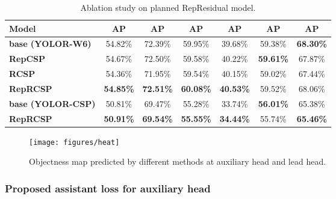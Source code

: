 \documentclass[10pt,twocolumn,letterpaper]{article}
\begin{document}
		
		
		\begin{table}[h]
			\centering
			\begin{threeparttable}[h]
				\footnotesize
				\caption{Ablation study on planned RepResidual model.}
				\label{table:reverse}
				\setlength\tabcolsep{.5pt}
				\begin{tabular}{lcccccc}
					\toprule
					\textbf{Model} & \textbf{AP} & \textbf{AP} & \textbf{AP} & \textbf{AP} & \textbf{AP} & \textbf{AP}  \\	
					\midrule
					\textbf{base (YOLOR-W6)} & 54.82\% & 72.39\% & 59.95\% & 39.68\% & 59.38\% & \textbf{68.30\%} \\
					\textbf{RepCSP} & 54.67\% & 72.50\% & 59.58\% & 40.22\% & \textbf{59.61\%} & 67.87\% \\
					\textbf{RCSP} & 54.36\% & 71.95\% & 59.54\% & 40.15\% & 59.02\% & 67.44\% \\
					\textbf{RepRCSP} & \textbf{54.85\%} & \textbf{72.51\%} & \textbf{60.08\%} & \textbf{40.53\%} & 59.52\% & 68.06\% \\
					\midrule
					\textbf{base (YOLOR-CSP)} & 50.81\% & 69.47\% & 55.28\% & 33.74\% & \textbf{56.01\%} & 65.38\% \\
					\textbf{RepRCSP} & \textbf{50.91\%} & \textbf{69.54\%} & \textbf{55.55\%} & \textbf{34.44\%} & 55.74\% & \textbf{65.46\%} \\
					\bottomrule
				\end{tabular}
\end{threeparttable}
		\end{table}
		
		\begin{figure*}[h]
			\begin{center}
				\texttt{[image: figures/heat]}
			\end{center}
			\caption{Objectness map predicted by different methods at auxiliary head and lead head.}
			\label{fig:heat}
			\vspace{-4mm}
		\end{figure*}
		
		\subsubsection{Proposed assistant loss for auxiliary head}
		
\end{document}
